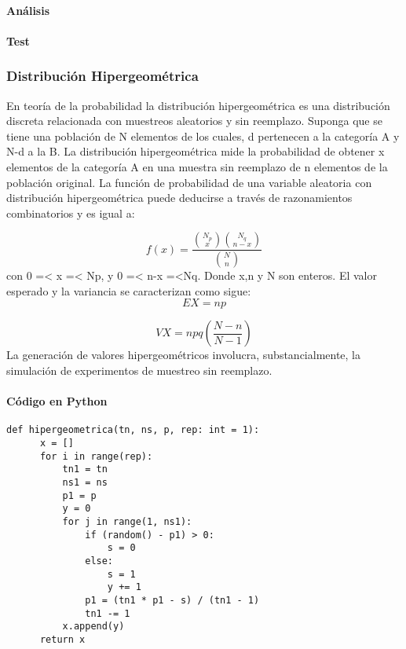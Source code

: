 \documentclass{article}
\begin{document}
  \paragraph{Análisis}

  \paragraph{Test}

  \subsubsection{Distribución Hipergeométrica}
  En teoría de la probabilidad la distribución hipergeométrica es una distribución discreta relacionada con muestreos
  aleatorios y sin reemplazo. Suponga que se tiene una población de N elementos de los cuales, d pertenecen a la categoría
  A y N-d a la B. La distribución hipergeométrica mide la probabilidad de obtener x elementos de la categoría A en una
  muestra sin reemplazo de n elementos de la población original.
  La función de probabilidad de una variable aleatoria con distribución hipergeométrica puede deducirse a través de
  razonamientos combinatorios y es igual a:

  \begin{equation}
    f(x) = \frac{\binom{N_{p}}{x}\binom{N_{q}}{n-x}}{\binom{N}{n}}
    \end{equation}
  con 0 =< x =< Np, y 0 =< n-x =<Nq. Donde x,n y N son enteros. El valor esperado y la variancia se caracterizan como sigue:
  \begin{equation}
    EX = np
    \end{equation}

  \begin{equation}
    VX = npq(\frac{N-n}{N-1})
    \end{equation}
  La generación de valores hipergeométricos involucra, substancialmente, la simulación de experimentos de muestreo sin reemplazo.

  \paragraph{Código en Python}
  \begin{lstlisting}[style = Python]
   def hipergeometrica(tn, ns, p, rep: int = 1):
      x = []
      for i in range(rep):
          tn1 = tn
          ns1 = ns
          p1 = p
          y = 0
          for j in range(1, ns1):
              if (random() - p1) > 0:
                  s = 0
              else:
                  s = 1
                  y += 1
              p1 = (tn1 * p1 - s) / (tn1 - 1)
              tn1 -= 1
          x.append(y)
      return x
  \end{lstlisting}
\end{document}
